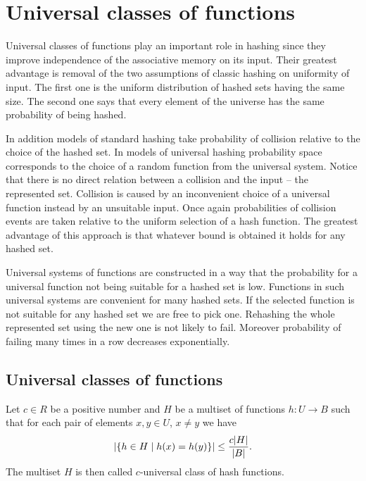 \chapter{Universal classes of functions}
\label{chapter-universal-classes}

Universal classes of functions play an important role in hashing since they improve independence of the associative memory on its input. Their greatest advantage is removal of the two assumptions of classic hashing on uniformity of input. The first one is the uniform distribution of hashed sets having the same size. The second one says that every element of the universe has the same probability of being hashed. 

In addition models of standard hashing take probability of collision relative to the choice of the hashed set. In models of universal hashing probability space corresponds to the choice of a random function from the universal system. Notice that there is no direct relation between a collision and the input -- the represented set. Collision is caused by an inconvenient choice of a universal function instead by an unsuitable input. Once again probabilities of collision events are taken relative to the uniform selection of a hash function. The greatest advantage of this approach is that whatever bound is obtained it holds for any hashed set. 

Universal systems of functions are constructed in a way that the probability for a universal function not being suitable for a hashed set is low. Functions in such universal systems are convenient for many hashed sets. If the selected function is not suitable for any hashed set we are free to pick one. Rehashing the whole represented set using the new one is not likely to fail. Moreover probability of failing many times in a row decreases exponentially.

\section{Universal classes of functions}

\begin{definition}
\label{c_universal_system}
Let $c \in R$ be a positive number and $H$ be a multiset of functions $h: U \rightarrow B$ such that for each pair of elements $x, y \in U$, $x \neq y$ we have \[ \left| \lbrace h \in H \mid h(x) = h(y) \rbrace \right| \leq \frac {c |H|}{|B|} \text{.} \] The multiset $H$ is then called $c$-universal class of hash functions.
\end{definition}

